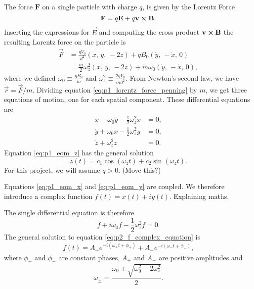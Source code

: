 The force $\mathbf{F}$ on a single particle with charge $q$, is given by the Lorentz Force 
\begin{equation}
    \mathbf{F} = q \mathbf{E} + q \mathbf{v} \cross \mathbf{B}. \label{eq:em_force}
\end{equation}
Inserting the expressions for $\vec{E}$ and computing the cross product $\mathbf{v}\cross \mathbf{B}$ the resulting Lorentz force on the particle is 
\begin{equation} \label{eq:p1_lorentz_force_penning}
    \begin{split}
        \vec{F} &= \frac{q V_0}{d^2}(x,\,y,\,-2z) + q B_0 (\dot{y},\,-\dot{x},\,0) \\
        &= \frac{m}{2}\omega_z^2 (x,\,y,\,-2z) + m \omega_0 (\dot{y},\,-\dot{x},\,0),
    \end{split}
\end{equation} 
where we defined $\omega_0\equiv \frac{qB_0}{m}$ and $\omega_z^2 \equiv \frac{2qV_0}{m d^2}$. From Newton's second law, we have $\ddot{\vec{r}}=\vec{F}/m$. Dividing equation \eqref{eq:p1_lorentz_force_penning} by $m$, we get three equations of motion, one for each spatial component. These differential equations are 
\begin{align}
    \ddot{x} - \omega_0 \dot{y} - \frac{1}{2} \omega_z^2 x &= 0, \label{eq:p1_eom_x} \\ 
    \ddot{y} + \omega_0 \dot{x} - \frac{1}{2} \omega_z^2 y &= 0, \label{eq:p1_eom_y} \\ 
    \ddot{z} + \omega_z^2 z &= 0. \label{eq:p1_eom_z}
\end{align}
Equation \eqref{eq:p1_eom_z} has the general solution   
\begin{equation}
    z(t) = c_1 \cos(\omega_z t) + c_2 \sin(\omega_z t). \label{eq:p1_diffeq_solution_z}
\end{equation}
For this project, we will assume $q>0$. (Move this?)

Equations \eqref{eq:p1_eom_x} and \eqref{eq:p1_eom_y} are coupled. We therefore introduce a complex function $f(t)=x(t)+i y(t)$. Explaining maths. 

The single differential equation is therefore 
\begin{equation}
    \ddot{f} + i\omega_0 \dot{f} - \frac{1}{2}\omega_z^2 f = 0. \label{eq:p2_f_complex_equation}
\end{equation}
The general solution to equation \eqref{eq:p2_f_complex_equation} is 
\begin{equation}
    f(t) = A_+ e^{-i(\omega_+ t + \phi_+)} + A_- e^{-i(\omega_- t + \phi_-)}, \label{eq:p3_f_general_solution}
\end{equation}
where $\phi_+$ and $\phi_-$ are constant phases, $A_+$ and $A_-$ are positive amplitudes and 
\begin{equation}
    \omega_\pm = \frac{\omega_0 \pm \sqrt{\omega_0^2 - 2\omega_z^2}}{2}. \label{eq:p3_omega_pm}
\end{equation}




